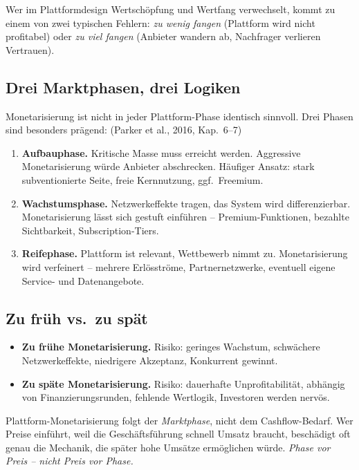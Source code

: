 \documentclass[11pt,a4paper,oneside]{article}
\newcommand{\caveatfontfallback}{\itshape}
\newcommand\caveatfont{\caveatfontfallback}%
\newcommand{\akzent}[1]{{\caveatfont\color{lpAmber}#1}}
\newcommand{\fachbegriff}[1]{\textbf{#1}}
\newcommand{\quelle}[1]{{\footnotesize\color{lpGray}(#1)}}
\begin{document}
Wer im Plattformdesign Wertschöpfung und Wertfang verwechselt, kommt zu einem von zwei typischen Fehlern: \emph{zu wenig fangen} (Plattform wird nicht profitabel) oder \emph{zu viel fangen} (Anbieter wandern ab, Nachfrager verlieren Vertrauen).

\subsection{Drei Marktphasen, drei Logiken}

Monetarisierung ist nicht in jeder Plattform-Phase identisch sinnvoll. Drei Phasen sind besonders prägend: \quelle{Parker et al., 2016, Kap.~6--7}

\begin{enumerate}
  \item \fachbegriff{Aufbauphase.} Kritische Masse muss erreicht werden. Aggressive Monetarisierung würde Anbieter abschrecken. Häufiger Ansatz: stark subventionierte Seite, freie Kernnutzung, ggf.\ Freemium.
  \item \fachbegriff{Wachstumsphase.} Netzwerkeffekte tragen, das System wird differenzierbar. Monetarisierung lässt sich gestuft einführen -- Premium-Funktionen, bezahlte Sichtbarkeit, Subscription-Tiers.
  \item \fachbegriff{Reifephase.} Plattform ist relevant, Wettbewerb nimmt zu. Monetarisierung wird verfeinert -- mehrere Erlösströme, Partnernetzwerke, eventuell eigene Service- und Datenangebote.
\end{enumerate}

\subsection{Zu früh vs.\ zu spät}

\begin{itemize}
  \item \textbf{Zu frühe Monetarisierung.} Risiko: geringes Wachstum, schwächere Netzwerkeffekte, niedrigere Akzeptanz, Konkurrent gewinnt.
  \item \textbf{Zu späte Monetarisierung.} Risiko: dauerhafte Unprofitabilität, abhängig von Finanzierungsrunden, fehlende Wertlogik, Investoren werden nervös.
\end{itemize}

\begin{eselsbox}[Eselsbrücke: \akzent{Phase vor Preis}]
Plattform-Monetarisierung folgt der \emph{Marktphase}, nicht dem Cashflow-Bedarf. Wer Preise einführt, weil die Geschäftsführung schnell Umsatz braucht, beschädigt oft genau die Mechanik, die später hohe Umsätze ermöglichen würde. \emph{Phase vor Preis -- nicht Preis vor Phase.}
\end{eselsbox}
\end{document}
